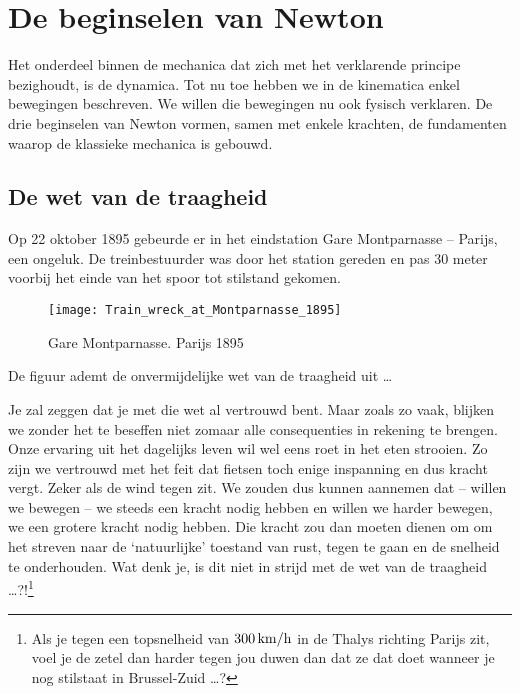 
\chapter{De beginselen van Newton}
\label{debeginselenvannewton}

Het onderdeel binnen de mechanica dat zich met het verklarende principe bezighoudt, is de dynamica. Tot nu toe hebben we in de kinematica enkel bewegingen beschreven. We willen die bewegingen nu ook fysisch verklaren. De drie beginselen van Newton vormen, samen met enkele krachten, de fundamenten waarop de klassieke mechanica is gebouwd. 

\newpage

\section{De wet van de traagheid}

Op 22 oktober 1895 gebeurde er in het eindstation Gare Montparnasse -- Parijs, een ongeluk. De treinbestuurder was door het station gereden en pas 30 meter voorbij het einde van het spoor tot stilstand gekomen.
\begin{figure}[h]
\begin{center}
\texttt{[image: Train\_wreck\_at\_Montparnasse\_1895]}
\caption{Gare Montparnasse. Parijs 1895}
\end{center}
\end{figure}

De figuur ademt de onvermijdelijke wet van de traagheid uit \ldots
\newline
{}

Je zal zeggen dat je met die wet al vertrouwd bent. Maar zoals zo vaak, blijken we zonder het te beseffen niet zomaar alle consequenties in rekening te brengen. Onze ervaring uit het dagelijks leven
wil wel eens roet in het eten strooien. Zo zijn we vertrouwd met het feit dat
fietsen toch enige inspanning en dus kracht vergt. Zeker als de wind tegen zit.
We zouden dus kunnen aannemen dat -- willen we bewegen -- we steeds een kracht nodig
hebben en willen we harder bewegen, we een grotere kracht nodig hebben. Die kracht zou dan moeten dienen om om het streven naar de `natuurlijke' toestand van rust, tegen te gaan en de snelheid te onderhouden. Wat denk je, is dit niet in strijd met de wet van de traagheid \ldots?!\footnote{Als je tegen een topsnelheid van $300\rm\,km/h$ in de Thalys richting Parijs zit, voel je de zetel dan harder tegen jou duwen dan dat ze dat doet wanneer je nog stilstaat in Brussel-Zuid \ldots?}

